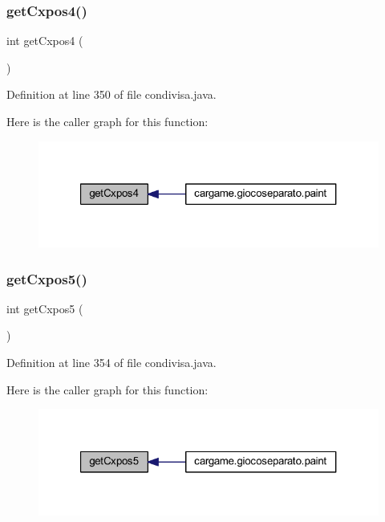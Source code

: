 \subsubsection{\texorpdfstring{get\+Cxpos4()}{getCxpos4()}}
{\footnotesize\ttfamily int get\+Cxpos4 (\begin{DoxyParamCaption}{ }\end{DoxyParamCaption})}



Definition at line 350 of file condivisa.\+java.

Here is the caller graph for this function\+:
\nopagebreak
\begin{figure}[H]
\begin{center}
\leavevmode
\includegraphics[width=321pt]{classcargame_1_1condivisa_a4043cc22dca0beb331b9092cd575990b_icgraph}
\end{center}
\end{figure}
\mbox{\label{classcargame_1_1condivisa_a771f05879a86ed8fc0da2333d872989e}} 
\subsubsection{\texorpdfstring{get\+Cxpos5()}{getCxpos5()}}
{\footnotesize\ttfamily int get\+Cxpos5 (\begin{DoxyParamCaption}{ }\end{DoxyParamCaption})}



Definition at line 354 of file condivisa.\+java.

Here is the caller graph for this function\+:
\nopagebreak
\begin{figure}[H]
\begin{center}
\leavevmode
\includegraphics[width=321pt]{classcargame_1_1condivisa_a771f05879a86ed8fc0da2333d872989e_icgraph}
\end{center}
\end{figure}
\mbox{\label{classcargame_1_1condivisa_ada67793f376b8b32838932eb4fde8873}} 
